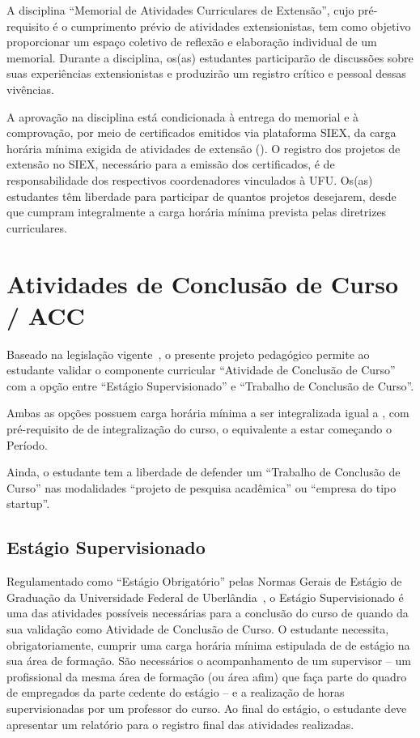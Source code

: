 A disciplina ``Memorial de Atividades Curriculares de Extensão'', cujo pré-requisito é o cumprimento prévio de atividades extensionistas, tem como objetivo proporcionar um espaço coletivo de reflexão e elaboração individual de um memorial. Durante a disciplina, os(as) estudantes participarão de discussões sobre suas experiências extensionistas e produzirão um registro crítico e pessoal dessas vivências.

A aprovação na disciplina está condicionada à entrega do memorial e à comprovação, por meio de certificados emitidos via plataforma SIEX, da carga horária mínima exigida de atividades de extensão (\unskip). O registro dos projetos de extensão no SIEX, necessário para a emissão dos certificados, é de responsabilidade dos respectivos coordenadores vinculados à UFU. Os(as) estudantes têm liberdade para participar de quantos projetos desejarem, desde que cumpram integralmente a carga horária mínima prevista pelas diretrizes curriculares.


\section{Atividades de Conclusão de Curso / ACC}
\label{sec:acc_conclusao}

Baseado na legislação vigente~\cite{MEC:CNE:CES:5:2016}, o presente projeto pedagógico permite ao estudante validar o componente curricular ``Atividade de Conclusão de Curso'' com a opção entre ``Estágio Supervisionado'' e ``Trabalho de Conclusão de Curso''.

Ambas as opções possuem carga horária mínima a ser integralizada igual a \unskip, com pré-requisito de de integralização do curso, o equivalente a estar começando o  Período.

Ainda, o estudante tem a liberdade de defender um ``Trabalho de Conclusão de Curso'' nas modalidades ``projeto de pesquisa acadêmica'' ou ``empresa do tipo startup''.

\subsection{Estágio Supervisionado}

Regulamentado como ``Estágio Obrigatório'' pelas Normas Gerais de Estágio de Graduação da Universidade Federal de Uberlândia~\cite{UFU:CONGRAD:93:2023}, o Estágio Supervisionado é uma das atividades possíveis necessárias para a conclusão do curso de \nomecursonovo quando da sua validação como Atividade de Conclusão de Curso. O estudante necessita, obrigatoriamente, cumprir uma carga horária mínima estipulada de de estágio na sua área de formação. São necessários o acompanhamento de um supervisor -- um profissional da mesma área de formação (ou área afim) que faça parte do quadro de empregados da parte cedente do estágio -- e a realização de horas supervisionadas por um professor do curso. Ao final do estágio, o estudante deve apresentar um relatório para o registro final das atividades realizadas.

